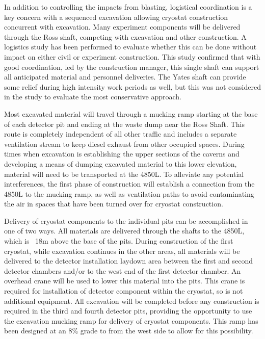 In addition to controlling the impacts from blasting, logistical coordination is a key concern with a sequenced excavation allowing cryostat construction concurrent with excavation. Many experiment components will be delivered through the Ross shaft, competing with excavation and other construction. A logistics study\cite{lbnf-logistics} has been performed to evaluate whether this can be done without impact on either civil or experiment construction.  This study confirmed that with good coordination, led by the construction manager, this single shaft can support all anticipated material and personnel deliveries.  The Yates shaft can provide some relief during high intensity work periods as well, but this was not considered in the study to evaluate the most conservative approach.

Most excavated material will travel through a mucking ramp starting at the base of each detector pit and ending at the waste dump near the Ross Shaft. This route is completely independent of all other traffic and includes a separate ventilation stream to keep diesel exhaust from other occupied spaces. During times when excavation is establishing the upper sections of the caverns and developing a means of dumping excavated material to this lower elevation, material will need to be transported at the 4850L. To alleviate any potential interferences, the first phase of construction will establish a connection from the 4850L to the mucking ramp, as well as ventilation paths to avoid contaminating the air in spaces that have been turned over for cryostat construction. 

Delivery of cryostat components to the individual pits can be accomplished in one of two ways. All materials are delivered through the shafts to the 4850L, which is ~18m above the base of the pits. During construction of the first cryostat, while excavation continues in the other areas, all materials will be delivered to the detector installation laydown area between the first and second detector chambers and/or to the west end of the first detector chamber. An overhead crane will be used to lower this material into the pits. This crane is required for installation of detector component within the cryostat, so is not additional equipment. All excavation will be completed before any construction is required in the third and fourth detector pits, providing the opportunity to use the excavation mucking ramp for delivery of cryostat components. This ramp has been designed at an 8\% grade to from the west side to allow for this possibility. 

